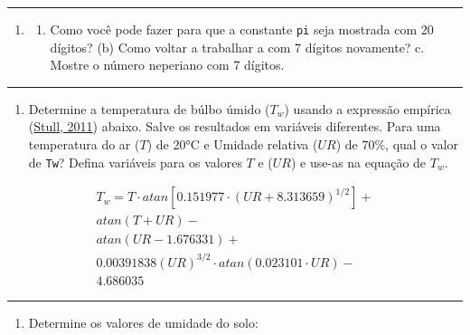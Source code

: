 \documentclass[]{book}
\providecommand{\tightlist}{%
  \setlength{\itemsep}{0pt}\setlength{\parskip}{0pt}}
\begin{document}
\begin{center}\rule{0.5\linewidth}{\linethickness}\end{center}

\begin{enumerate}
\def\labelenumi{\arabic{enumi}.}
\setcounter{enumi}{5}
\item
  \begin{enumerate}
  \def\labelenumii{(\alph{enumii})}
  \tightlist
  \item
    Como você pode fazer para que a constante \texttt{pi} seja mostrada
    com 20 dígitos? (b) Como voltar a trabalhar a com 7 dígitos
    novamente? c. Mostre o número neperiano com 7 dígitos.
  \end{enumerate}
\end{enumerate}

\begin{center}\rule{0.5\linewidth}{\linethickness}\end{center}

\begin{enumerate}
\def\labelenumi{\arabic{enumi}.}
\setcounter{enumi}{6}
\tightlist
\item
  Determine a temperatura de búlbo úmido (\(T_{w}\)) usando a expressão
  empírica
  (\href{http://journals.ametsoc.org/doi/abs/10.1175/JAMC-D-11-0143.1\%5D}{Stull,
  2011}) abaixo. Salve os resultados em variáveis diferentes. Para uma
  temperatura do ar (\(T\)) de 20°C e Umidade relativa (\(UR\)) de 70\%,
  qual o valor de \texttt{Tw}? Defina variáveis para os valores \(T\) e
  (\(UR\)) e use-as na equação de \(T_{w}\).
\end{enumerate}

\[
\begin{aligned} 
T_{w}=T\cdot atan\left [ 0.151977\cdot \left ( UR+8.313659 \right )^{1/2} \right ]+ \\
atan\left (T+UR \right )-\\
atan\left ( UR-1.676331 \right )+\\
0.00391838\left ( UR \right )^{3/2}\cdot atan\left ( 0.023101\cdot UR \right )-\\
4.686035
\end{aligned} 
\]

\begin{center}\rule{0.5\linewidth}{\linethickness}\end{center}

\begin{enumerate}
\def\labelenumi{\arabic{enumi}.}
\setcounter{enumi}{7}
\tightlist
\item
  Determine os valores de umidade do solo:
\end{enumerate}
\end{document}
